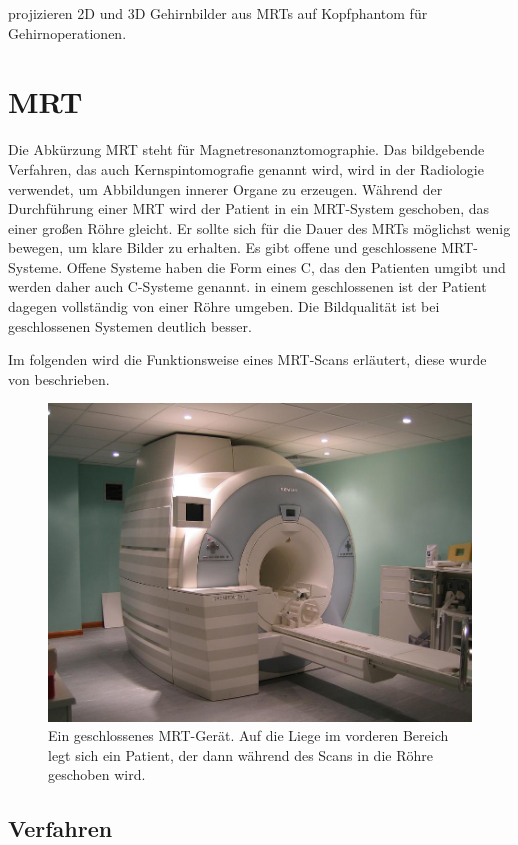 \citet{Calvin01} projizieren 2D und 3D Gehirnbilder aus MRTs auf Kopfphantom für Gehirnoperationen.

\section{MRT}
\label{mrt}												 %

Die Abkürzung MRT steht für Magnetresonanztomographie. Das bildgebende Verfahren, das auch Kernspintomografie genannt wird, wird in der Radiologie verwendet, um Abbildungen innerer Organe zu erzeugen. Während der Durchführung einer MRT wird der Patient in ein MRT-System geschoben, das einer großen Röhre gleicht. Er sollte sich für die Dauer des MRTs möglichst wenig bewegen, um klare Bilder zu erhalten.
Es gibt offene und geschlossene MRT-Systeme. Offene Systeme haben die Form eines C, das den Patienten umgibt und werden daher auch C-Systeme genannt. in einem geschlossenen ist der Patient dagegen vollständig von einer Röhre umgeben. Die Bildqualität ist bei geschlossenen Systemen deutlich besser.

Im folgenden wird die Funktionsweise eines MRT-Scans erläutert, diese wurde von \citet{weishaupt09} beschrieben.

\begin{figure}
	\centering
	\includegraphics[width=0.5\linewidth]{images/mri.jpg}
	\caption{Ein geschlossenes MRT-Gerät. Auf die Liege im vorderen Bereich legt sich ein Patient, der dann während des Scans in die Röhre geschoben wird. }
	\label{img:mri}
\end{figure}
 	
\subsection{Verfahren}

